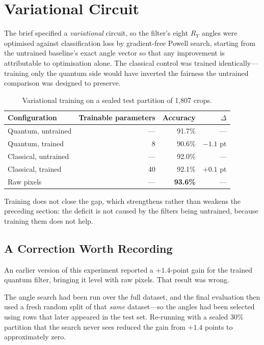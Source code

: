 \documentclass[11pt,a4paper]{article}
\begin{document}
\section{Variational Circuit}

The brief specified a \emph{variational} circuit, so the filter's eight $R_Y$
angles were optimised against classification loss by gradient-free Powell search,
starting from the untrained baseline's exact angle vector so that any improvement
is attributable to optimisation alone. The classical control was trained
identically---training only the quantum side would have inverted the fairness the
untrained comparison was designed to preserve.

\begin{table}[h]
\centering
\caption{Variational training on a sealed test partition of 1{,}807 crops.}
\begin{tabular}{@{}lrrr@{}}
\toprule
Configuration & Trainable parameters & Accuracy & $\Delta$ \\
\midrule
Quantum, untrained & --- & 91.7\% & --- \\
Quantum, trained & 8 & 90.6\% & $-1.1$ pt \\
Classical, untrained & --- & 92.0\% & --- \\
Classical, trained & 40 & 92.1\% & $+0.1$ pt \\
Raw pixels & --- & \textbf{93.6\%} & --- \\
\bottomrule
\end{tabular}
\end{table}

Training does not close the gap, which strengthens rather than weakens the
preceding section: the deficit is not caused by the filters being untrained,
because training them does not help.

\subsection{A Correction Worth Recording}

An earlier version of this experiment reported a $+1.4$-point gain for the
trained quantum filter, bringing it level with raw pixels. That result was
wrong.

The angle search had been run over the full dataset, and the final evaluation
then used a fresh random split of that \emph{same} dataset---so the angles had
been selected using rows that later appeared in the test set. Re-running with a
sealed 30\% partition that the search never sees reduced the gain from $+1.4$
points to approximately zero.
\end{document}
